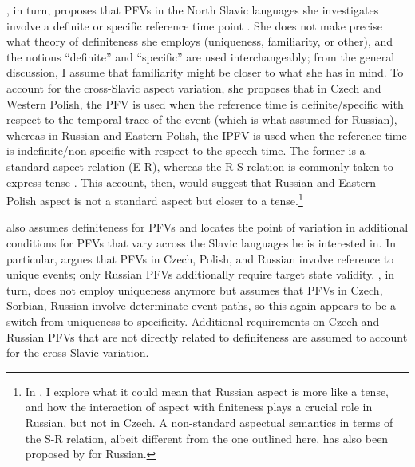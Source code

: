 \documentclass[output=paper,colorlinks,citecolor=brown]{langscibook}
\begin{document}
\citet{klimek22}, in turn, proposes that PFVs in the North Slavic languages she investigates involve a definite or specific reference time point \citep[as proposed for Russian by][]{ramchandlingua}. She does not make precise what theory of definiteness she employs (uniqueness, familiarity, or other), and the notions ``definite'' and ``specific'' are used interchangeably; from the general discussion, I assume that familiarity might be closer to what she has in mind. To account for the cross-Slavic aspect variation, she proposes that in Czech and Western Polish, the PFV is used when the reference time is definite/specific with respect to the temporal trace of the event (which is what \citeauthor{ramchandlingua} assumed for Russian), whereas in Russian and Eastern Polish, the IPFV is used when the reference time is indefinite/non-specific with respect to the speech time. The former is a standard aspect relation (E-R), whereas the R-S relation is commonly taken to express tense \citep[e.g.][]{Reichenbach47,Klein1994}. This account, then, would suggest that Russian and Eastern Polish aspect is not a standard aspect but closer to a tense.\footnote{In \citet{gehrkeadv23}, I explore what it could mean that Russian aspect is more like a tense, and how the interaction of aspect with finiteness plays a crucial role in Russian, but not in Czech. A non-standard aspectual semantics in terms of the S-R relation, albeit different from the one outlined here, has also been proposed by \citet{Borik2006} for Russian.} 

\citet{Mueller-Reichau2018a,mueller23} also assumes definiteness for PFVs and locates the point of variation in additional conditions for PFVs that vary across the Slavic languages he is interested in. In particular, \citet{Mueller-Reichau2018a} argues that PFVs in Czech, Polish, and Russian involve reference to unique events; only Russian PFVs additionally require target state validity. \citet{mueller23}, in turn, does not employ uniqueness anymore but assumes that PFVs in Czech, Sorbian, Russian involve determinate event paths, so this again appears to be a switch from uniqueness to specificity. Additional requirements on Czech and Russian PFVs that are not directly related to definiteness are assumed to account for the cross-Slavic variation.
\end{document}
